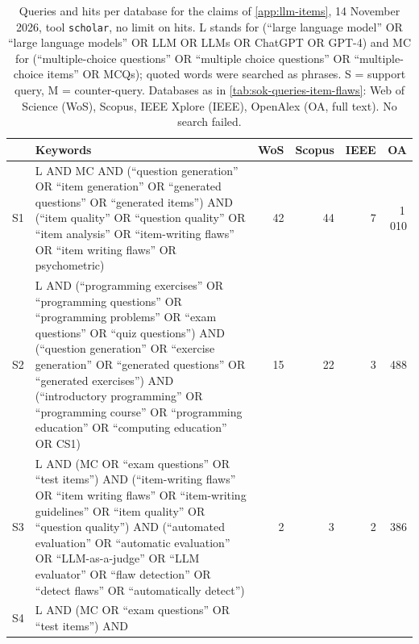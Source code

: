 \begin{table}[htbp]
  \caption{Queries and hits per database for the claims of
    \cref{app:llm-items}, 14 November 2026, tool \texttt{scholar}, no
    limit on hits.  L stands for (\enquote{large language model} OR
    \enquote{large language models} OR LLM OR LLMs OR ChatGPT OR GPT-4)
    and MC for (\enquote{multiple-choice questions} OR \enquote{multiple
    choice questions} OR \enquote{multiple-choice items} OR MCQs); quoted
    words were searched as phrases.  S = support query, M =
    counter-query.  Databases as in \cref{tab:sok-queries-item-flaws}:
    Web of Science (WoS), Scopus, IEEE Xplore (IEEE), OpenAlex (OA, full
    text).  No search failed.}
  \label{tab:sok-queries-llm-items}
  \centering\footnotesize
  \begin{tabularx}{\linewidth}{@{}l>{\raggedright\arraybackslash}X
    rrrr@{}}
    \toprule
       & Keywords & WoS & Scopus & IEEE & OA \\
    \midrule
    S1 & L AND MC AND (\enquote{question generation} OR \enquote{item
         generation} OR \enquote{generated questions} OR \enquote{generated
         items}) AND (\enquote{item quality} OR \enquote{question quality}
         OR \enquote{item analysis} OR \enquote{item-writing flaws} OR
         \enquote{item writing flaws} OR psychometric)
       & 42 & 44 & 7 & 1\,010 \\
    S2 & L AND (\enquote{programming exercises} OR \enquote{programming
         questions} OR \enquote{programming problems} OR \enquote{exam
         questions} OR \enquote{quiz questions}) AND (\enquote{question
         generation} OR \enquote{exercise generation} OR \enquote{generated
         questions} OR \enquote{generated exercises}) AND
         (\enquote{introductory programming} OR \enquote{programming
         course} OR \enquote{programming education} OR \enquote{computing
         education} OR CS1)
       & 15 & 22 & 3 & 488 \\
    S3 & L AND (MC OR \enquote{exam questions} OR \enquote{test items}) AND
         (\enquote{item-writing flaws} OR \enquote{item writing flaws} OR
         \enquote{item-writing guidelines} OR \enquote{item quality} OR
         \enquote{question quality}) AND (\enquote{automated evaluation} OR
         \enquote{automatic evaluation} OR \enquote{LLM-as-a-judge} OR
         \enquote{LLM evaluator} OR \enquote{flaw detection} OR
         \enquote{detect flaws} OR \enquote{automatically detect})
       & 2 & 3 & 2 & 386 \\
    S4 & L AND (MC OR \enquote{exam questions} OR \enquote{test items}) AND

\end{tabularx}
\end{table}
